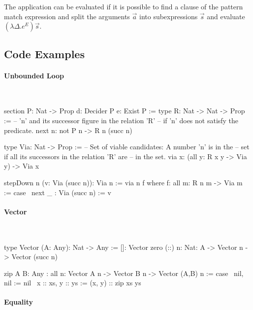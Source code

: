 The application can be evaluated if it is possible to find a clause of the
pattern match expression and split the arguments $\vec a$ into subexpressions
$\vec s$ and evaluate $(\lambda \Delta. e^E) \vec s$.




\subsection{Code Examples}



\paragraph{Unbounded Loop}

\ \begin{alba}
    section
        P: Nat -> Prop
        d: Decider P
        e: Exist P
    :=
        type R: Nat -> Nat -> Prop :=
                -- 'n' and its successor figure in the relation 'R'
                -- if 'n' does not satisfy the predicate.
            next {n}: not P n -> R n (succ n)

        type Via: Nat -> Prop :=
                -- Set of viable candidates: A number 'n' is in the
                -- set if all its successors in the relation 'R' are
                -- in the set.
            via {x}: (all {y}: R x y -> Via y) -> Via x

        stepDown {n} (v: Via (succ n)): Via n :=
            via {n} f where
                f: all {m}: R n m -> Via m
                := case
                    \ next _ : Via (succ n) := v
\end{alba}


\paragraph{Vector}

\ \begin{alba}
    type Vector (A: Any): Nat -> Any :=
        []:  Vector zero
        (::) {n: Nat}: A -> Vector n -> Vector (succ n)

    zip {A B: Any}
    : all {n}: Vector A n -> Vector B n -> Vector (A,B) n
    := case
        \ nil,     nil     := nil
        \ x :: xs, y :: ys := (x, y) :: zip xs ys
\end{alba}



\paragraph{Equality}


